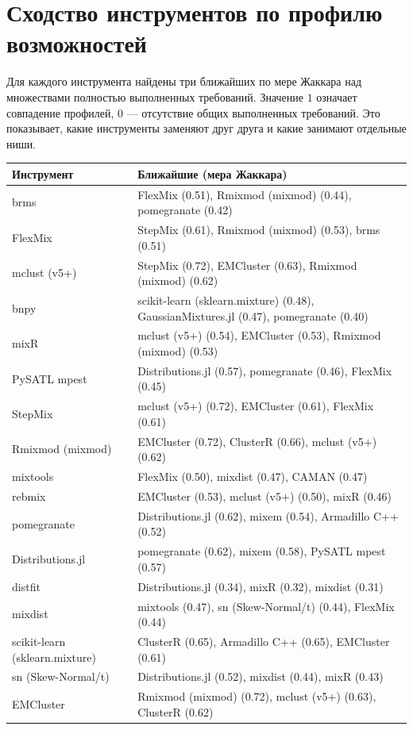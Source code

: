 \documentclass[10pt,a4paper]{article}
\begin{document}
\section{Сходство инструментов по профилю возможностей}
Для каждого инструмента найдены три ближайших по мере Жаккара над множествами полностью выполненных требований. Значение $1$ означает совпадение профилей,
$0$ --- отсутствие общих выполненных требований. Это показывает, какие инструменты заменяют друг друга и какие занимают отдельные ниши.
{\footnotesize
\begin{longtable}{@{}>{\raggedright\arraybackslash}p{3.8cm} >{\raggedright\arraybackslash}p{12.4cm}@{}}
\toprule
Инструмент & Ближайшие (мера Жаккара) \\
\midrule
\endhead
brms & FlexMix (0.51), Rmixmod (mixmod) (0.44), pomegranate (0.42) \\
FlexMix & StepMix (0.61), Rmixmod (mixmod) (0.53), brms (0.51) \\
mclust (v5+) & StepMix (0.72), EMCluster (0.63), Rmixmod (mixmod) (0.62) \\
bnpy & scikit-learn (sklearn.mixture) (0.48), GaussianMixtures.jl (0.47), pomegranate (0.40) \\
mixR & mclust (v5+) (0.54), EMCluster (0.53), Rmixmod (mixmod) (0.53) \\
PySATL mpest & Distributions.jl (0.57), pomegranate (0.46), FlexMix (0.45) \\
StepMix & mclust (v5+) (0.72), EMCluster (0.61), FlexMix (0.61) \\
Rmixmod (mixmod) & EMCluster (0.72), ClusterR (0.66), mclust (v5+) (0.62) \\
mixtools & FlexMix (0.50), mixdist (0.47), CAMAN (0.47) \\
rebmix & EMCluster (0.53), mclust (v5+) (0.50), mixR (0.46) \\
pomegranate & Distributions.jl (0.62), mixem (0.54), Armadillo C++ (0.52) \\
Distributions.jl & pomegranate (0.62), mixem (0.58), PySATL mpest (0.57) \\
distfit & Distributions.jl (0.34), mixR (0.32), mixdist (0.31) \\
mixdist & mixtools (0.47), sn (Skew-Normal/t) (0.44), FlexMix (0.44) \\
scikit-learn (sklearn.mixture) & ClusterR (0.65), Armadillo C++ (0.65), EMCluster (0.61) \\
sn (Skew-Normal/t) & Distributions.jl (0.52), mixdist (0.44), mixR (0.43) \\
EMCluster & Rmixmod (mixmod) (0.72), mclust (v5+) (0.63), ClusterR (0.62) \\

\end{longtable}}
\end{document}
